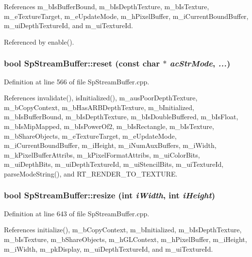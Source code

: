 References m\_\-b\-Is\-Buffer\-Bound, m\_\-b\-Is\-Depth\-Texture, m\_\-b\-Is\-Texture, m\_\-e\-Texture\-Target, m\_\-e\-Update\-Mode, m\_\-h\-Pixel\-Buffer, m\_\-i\-Current\-Bound\-Buffer, m\_\-ui\-Depth\-Texture\-Id, and m\_\-ui\-Texture\-Id.

Referenced by enable().
\subsubsection{\setlength{\rightskip}{0pt plus 5cm}bool Sp\-Stream\-Buffer::reset (const char $\ast$ {\em ac\-Str\-Mode},  {\em ...})}\label{classSpark_1_1SpStreamBuffer_a3}


Definition at line 566 of file Sp\-Stream\-Buffer.cpp.

References invalidate(), is\-Initialized(), m\_\-aus\-Poor\-Depth\-Texture, m\_\-b\-Copy\-Context, m\_\-b\-Has\-ARBDepth\-Texture, m\_\-b\-Initialized, m\_\-b\-Is\-Buffer\-Bound, m\_\-b\-Is\-Depth\-Texture, m\_\-b\-Is\-Double\-Buffered, m\_\-b\-Is\-Float, m\_\-b\-Is\-Mip\-Mapped, m\_\-b\-Is\-Power\-Of2, m\_\-b\-Is\-Rectangle, m\_\-b\-Is\-Texture, m\_\-b\-Share\-Objects, m\_\-e\-Texture\-Target, m\_\-e\-Update\-Mode, m\_\-i\-Current\-Bound\-Buffer, m\_\-i\-Height, m\_\-i\-Num\-Aux\-Buffers, m\_\-i\-Width, m\_\-k\-Pixel\-Buffer\-Attribs, m\_\-k\-Pixel\-Format\-Attribs, m\_\-ui\-Color\-Bits, m\_\-ui\-Depth\-Bits, m\_\-ui\-Depth\-Texture\-Id, m\_\-ui\-Stencil\-Bits, m\_\-ui\-Texture\-Id, parse\-Mode\-String(), and RT\_\-RENDER\_\-TO\_\-TEXTURE.
\subsubsection{\setlength{\rightskip}{0pt plus 5cm}bool Sp\-Stream\-Buffer::resize (int {\em i\-Width}, int {\em i\-Height})}\label{classSpark_1_1SpStreamBuffer_a4}


Definition at line 643 of file Sp\-Stream\-Buffer.cpp.

References initialize(), m\_\-b\-Copy\-Context, m\_\-b\-Initialized, m\_\-b\-Is\-Depth\-Texture, m\_\-b\-Is\-Texture, m\_\-b\-Share\-Objects, m\_\-h\-GLContext, m\_\-h\-Pixel\-Buffer, m\_\-i\-Height, m\_\-i\-Width, m\_\-pk\-Display, m\_\-ui\-Depth\-Texture\-Id, and m\_\-ui\-Texture\-Id.
